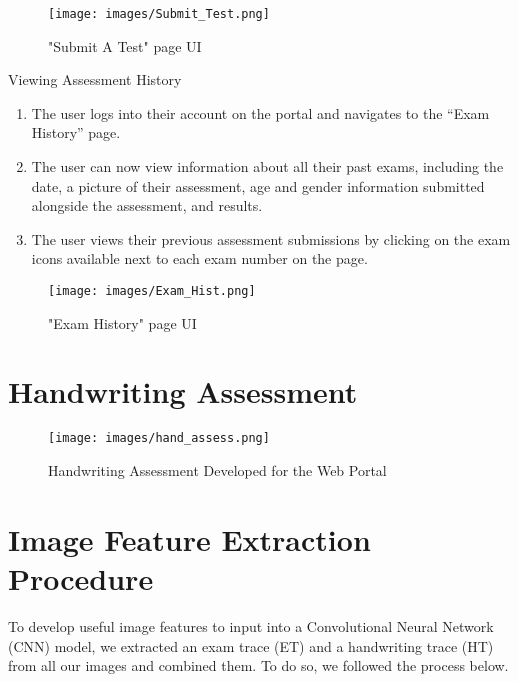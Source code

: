 \documentclass[pmlr,twocolumn,10pt]{jmlr} %
\begin{document}
\begin{figure}[h]
\label{fig:fig6}
\centering 
\texttt{[image: images/Submit\_Test.png]}
\caption{"Submit A Test" page UI}
\end{figure}

\vfill\eject

Viewing Assessment History

\begin{enumerate}
\item The user logs into their account on the portal and navigates to the “Exam History” page.
\item The user can now view information about all their past exams, including the date, a picture of their assessment, age and gender information submitted alongside the assessment, and results.
\item The user views their previous assessment submissions by clicking on the exam icons available next to each exam number on the page.
\end{enumerate}

\begin{figure} [h]
\label{fig:fig7}
\centering 
\texttt{[image: images/Exam\_Hist.png]}
\caption{"Exam History" page UI}
\end{figure}

\clearpage

\section{Handwriting Assessment}
\label{app:assessment}

\begin{figure} [h]
\label{fig:fig5}
\centering 
\texttt{[image: images/hand\_assess.png]}
\caption{Handwriting Assessment Developed for the Web Portal}
\end{figure}

\clearpage

\section{Image Feature Extraction Procedure}
\label{app:imgextraction}

To develop useful image features to input into a Convolutional Neural Network (CNN) model, we extracted an exam trace (ET) and a handwriting trace (HT) from all our images and combined them. To do so, we followed the process below.
\end{document}

